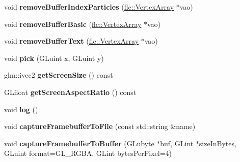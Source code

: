 \begin{DoxyCompactItemize}
\item 
void {\bfseries remove\+Buffer\+Index\+Particles} (\hyperlink{classflw_1_1flc_1_1VertexArray}{flc\+::\+Vertex\+Array} $\ast$vao)\hypertarget{classflw_1_1Engine_a6da509ab60518e077e10005ad0e8c574}{}\label{classflw_1_1Engine_a6da509ab60518e077e10005ad0e8c574}

\item 
void {\bfseries remove\+Buffer\+Basic} (\hyperlink{classflw_1_1flc_1_1VertexArray}{flc\+::\+Vertex\+Array} $\ast$vao)\hypertarget{classflw_1_1Engine_a8875663742749eca089b8aebdf903325}{}\label{classflw_1_1Engine_a8875663742749eca089b8aebdf903325}

\item 
void {\bfseries remove\+Buffer\+Text} (\hyperlink{classflw_1_1flc_1_1VertexArray}{flc\+::\+Vertex\+Array} $\ast$vao)\hypertarget{classflw_1_1Engine_a1ebb7161680655b335bdc953a5e7c242}{}\label{classflw_1_1Engine_a1ebb7161680655b335bdc953a5e7c242}

\item 
void {\bfseries pick} (G\+Luint x, G\+Luint y)\hypertarget{classflw_1_1Engine_a61e393402f74243407e16c038cad6ada}{}\label{classflw_1_1Engine_a61e393402f74243407e16c038cad6ada}

\item 
glm\+::ivec2 {\bfseries get\+Screen\+Size} () const \hypertarget{classflw_1_1Engine_acb58494b14f77ffda697755c9d53bc2e}{}\label{classflw_1_1Engine_acb58494b14f77ffda697755c9d53bc2e}

\item 
G\+Lfloat {\bfseries get\+Screen\+Aspect\+Ratio} () const \hypertarget{classflw_1_1Engine_a25e764da8237f6da7d411952f8f306ab}{}\label{classflw_1_1Engine_a25e764da8237f6da7d411952f8f306ab}

\item 
void {\bfseries log} ()\hypertarget{classflw_1_1Engine_a7238e9e2e50dd6ab0d832cb9e9e412c8}{}\label{classflw_1_1Engine_a7238e9e2e50dd6ab0d832cb9e9e412c8}

\item 
void {\bfseries capture\+Framebuffer\+To\+File} (const std\+::string \&name)\hypertarget{classflw_1_1Engine_aa7c76ee55048778b1d30a0cf84967a36}{}\label{classflw_1_1Engine_aa7c76ee55048778b1d30a0cf84967a36}

\item 
void {\bfseries capture\+Framebuffer\+To\+Buffer} (G\+Lubyte $\ast$buf, G\+Lint $\ast$size\+In\+Bytes, G\+Luint format=G\+L\+\_\+\+R\+G\+BA, G\+Lint bytes\+Per\+Pixel=4)\hypertarget{classflw_1_1Engine_ab9c11c99353f93372987954a15c87862}{}\label{classflw_1_1Engine_ab9c11c99353f93372987954a15c87862}


\end{DoxyCompactItemize}
